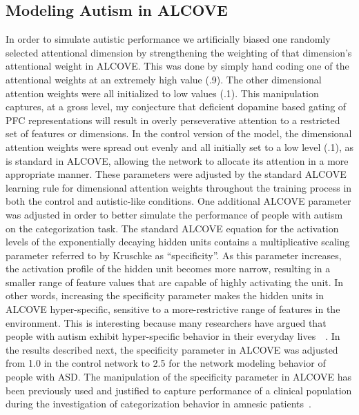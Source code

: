 \subsection{Modeling Autism in ALCOVE}
In order to simulate autistic performance we artificially biased one randomly selected attentional dimension by strengthening the weighting of that dimension's attentional weight in ALCOVE.  This was done by simply hand coding one of the attentional weights at an extremely high value (.9).  The other dimensional attention weights were all initialized to low values (.1).  This manipulation captures, at a gross level, my conjecture that deficient dopamine based gating of PFC representations will result in overly perseverative attention to a restricted set of features or dimensions.  In the control version of the model, the dimensional attention weights were spread out evenly and all initially set to a low level (.1), as is standard in ALCOVE, allowing the network to allocate its attention in a more appropriate manner.  These parameters were adjusted by the standard ALCOVE learning rule for dimensional attention weights throughout the training process in both the control and autistic-like conditions.  One additional ALCOVE parameter was adjusted in order to better simulate the performance of people with autism on the categorization task.  The standard ALCOVE equation for the activation levels of the exponentially decaying hidden units contains a multiplicative scaling parameter referred to  by Kruschke as ``specificity''.  As this parameter increases, the activation profile of the hidden unit becomes more narrow, resulting in a smaller range of feature values that are capable of highly activating the unit.  In other words, increasing the specificity parameter makes the hidden units in ALCOVE hyper-specific, sensitive to a more-restrictive range of features in the environment.  This is interesting because many researchers have argued that people with autism exhibit hyper-specific behavior in their everyday lives~~\cite{McClellandJL:2000:Autism,HappeF:1999:WCC}.  In the results described next, the specificity parameter in ALCOVE was adjusted from 1.0 in the control network to 2.5 for the network modeling behavior of people with ASD.  The manipulation of the specificity parameter in ALCOVE has been previously used and justified to capture performance of a clinical population during the investigation of categorization behavior in amnesic patients~\cite{NosofskyRM:1998:LCOVEAmnesia}. 


